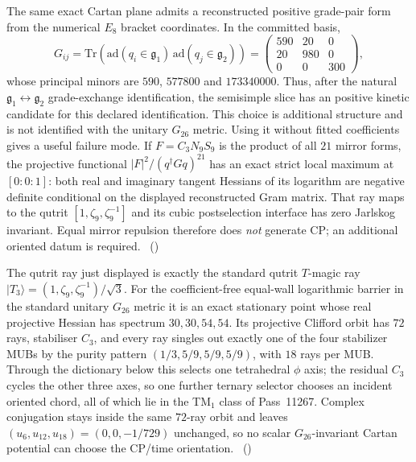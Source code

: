 The same exact Cartan plane admits a reconstructed positive grade-pair form from
the numerical $E_8$ bracket coordinates. In the committed basis,
\[
G_{ij}=\mathrm{Tr}\!\left(\mathrm{ad}(q_i\in\mathfrak g_1)\,
                              \mathrm{ad}(q_j\in\mathfrak g_2)\right)
 =\begin{pmatrix}590&20&0\\20&980&0\\0&0&300\end{pmatrix},
\]
whose principal minors are $590$, $577800$ and $173340000$. Thus, after the natural
$\mathfrak g_1\leftrightarrow\mathfrak g_2$ grade-exchange identification, the semisimple slice has an
positive kinetic candidate for this declared identification. This choice is
additional structure and is not identified with the unitary $G_{26}$ metric.
Using it without fitted coefficients gives a useful failure mode. If
$F=C_3N_9S_9$ is the product of all $21$ mirror forms, the projective functional
$|F|^2/(q^\dagger Gq)^{21}$ has an exact strict local maximum at $[0{:}0{:}1]$:
both real and imaginary tangent Hessians of its logarithm are negative definite
conditional on the displayed reconstructed Gram matrix.
That ray maps to the qutrit $[1,\zeta_9,\zeta_9^{-1}]$ and its cubic postselection
interface has zero Jarlskog invariant. Equal mirror repulsion therefore does
\emph{not} generate CP; an additional oriented datum is required.
\tierC\ ()

The qutrit ray just displayed is exactly the standard qutrit $T$-magic ray
$|T_3\rangle=(1,\zeta_9,\zeta_9^{-1})/\sqrt3$. For the coefficient-free
equal-wall logarithmic barrier in the standard unitary $G_{26}$ metric it is an
exact stationary point whose real projective Hessian has spectrum
$30,30,54,54$. Its projective Clifford orbit has $72$ rays, stabiliser $C_3$,
and every ray singles out exactly one of the four stabilizer MUBs by the purity
pattern $(1/3,5/9,5/9,5/9)$, with $18$ rays per MUB. Through the dictionary
below this selects one tetrahedral $\phi$ axis; the residual $C_3$ cycles the
other three axes, so one further ternary selector chooses an incident oriented
chord, all of which lie in the TM$_1$ class of Pass~11267. Complex conjugation
stays inside the same $72$-ray orbit and leaves
$(u_6,u_{12},u_{18})=(0,0,-1/729)$ unchanged, so no scalar $G_{26}$-invariant
Cartan potential can choose the CP/time orientation.
\tierC\ ()

